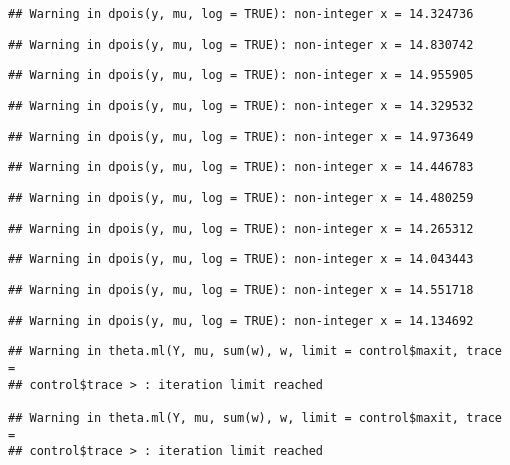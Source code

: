 \documentclass[
]{article}
\begin{document}
\begin{verbatim}
## Warning in dpois(y, mu, log = TRUE): non-integer x = 14.324736
\end{verbatim}

\begin{verbatim}
## Warning in dpois(y, mu, log = TRUE): non-integer x = 14.830742
\end{verbatim}

\begin{verbatim}
## Warning in dpois(y, mu, log = TRUE): non-integer x = 14.955905
\end{verbatim}

\begin{verbatim}
## Warning in dpois(y, mu, log = TRUE): non-integer x = 14.329532
\end{verbatim}

\begin{verbatim}
## Warning in dpois(y, mu, log = TRUE): non-integer x = 14.973649
\end{verbatim}

\begin{verbatim}
## Warning in dpois(y, mu, log = TRUE): non-integer x = 14.446783
\end{verbatim}

\begin{verbatim}
## Warning in dpois(y, mu, log = TRUE): non-integer x = 14.480259
\end{verbatim}

\begin{verbatim}
## Warning in dpois(y, mu, log = TRUE): non-integer x = 14.265312
\end{verbatim}

\begin{verbatim}
## Warning in dpois(y, mu, log = TRUE): non-integer x = 14.043443
\end{verbatim}

\begin{verbatim}
## Warning in dpois(y, mu, log = TRUE): non-integer x = 14.551718
\end{verbatim}

\begin{verbatim}
## Warning in dpois(y, mu, log = TRUE): non-integer x = 14.134692
\end{verbatim}

\begin{verbatim}
## Warning in theta.ml(Y, mu, sum(w), w, limit = control$maxit, trace =
## control$trace > : iteration limit reached

## Warning in theta.ml(Y, mu, sum(w), w, limit = control$maxit, trace =
## control$trace > : iteration limit reached
\end{verbatim}
\end{document}
